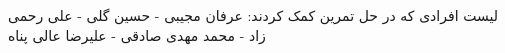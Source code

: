 \documentclass[]{article}
\begin{document}
\pageheader

\noindent
لیست افرادی که در حل تمرین کمک کردند:
عرفان مجیبی - حسین گلی - علی رحمی زاد - محمد مهدی صادقی - علیرضا عالی پناه







\end{document}
